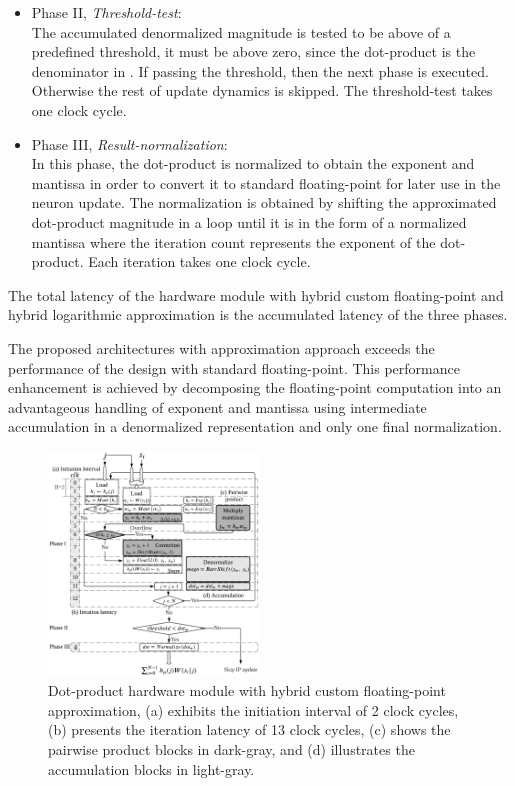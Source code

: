 \begin{itemize}
 	\item{Phase II, \emph{Threshold-test}}: \\
	The accumulated denormalized magnitude is tested to be above of a predefined threshold, it must be above zero, since the dot-product is the denominator in .
 	If passing the threshold, then the next phase is executed. Otherwise the rest of update dynamics is skipped. The threshold-test takes one clock cycle.
 	\item{Phase III, \emph{Result-normalization}}: \\
 	In this phase, the dot-product is normalized to obtain the exponent and mantissa in order to convert it to standard floating-point for later use in the neuron update. The normalization is obtained by shifting the approximated dot-product magnitude in a loop until it is in the form of a normalized mantissa where the iteration count represents the exponent of the dot-product. Each iteration takes one clock cycle.
 	
 \end{itemize}


The total latency of the hardware module with hybrid custom floating-point and hybrid logarithmic approximation is the accumulated latency of the three phases.

The proposed architectures with approximation approach exceeds the performance of the design with standard floating-point. This performance enhancement is achieved by decomposing the floating-point computation into an advantageous handling of exponent and mantissa using intermediate accumulation in a denormalized representation and only one final normalization.

\begin{figure}[t!]
	\centering
	\includegraphics[width=0.5\textwidth]{../figures/dot_product.pdf}
	\caption{Dot-product hardware module with hybrid custom floating-point approximation, (a) exhibits the initiation interval of 2 clock cycles, (b) presents the iteration latency of 13 clock cycles, (c) shows the pairwise product blocks in dark-gray, and (d) illustrates the accumulation blocks in light-gray.}
	\label{fig:dot_product_custom}
\end{figure}


